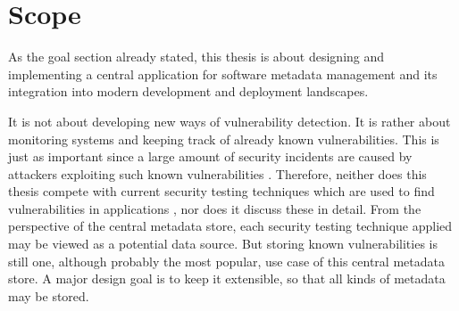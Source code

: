 \section{Scope}
As the goal section already stated, this thesis is about designing and implementing a central application for software metadata management and its integration into modern development and deployment landscapes.\par
It is not about developing new ways of vulnerability detection. It is rather about monitoring systems and keeping track of already known vulnerabilities. This is just as important since a large amount of security incidents are caused by attackers exploiting such known vulnerabilities \cite{ModelBasedSecurityTesting}. Therefore, neither does this thesis compete with current security testing techniques which are used to find vulnerabilities in applications \cite{SecurityTesting}, nor does it discuss these in detail. From the perspective of the central metadata store, each security testing technique applied may be viewed as a potential data source. But storing known vulnerabilities is still one, although probably the most popular, use case of this central metadata store. A major design goal is to keep it extensible, so that all kinds of metadata may be stored.  

